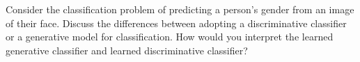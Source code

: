 Consider the classification problem of predicting a person's gender from an image of their face. Discuss the differences between adopting a discriminative classifier or a generative model for classification. How would you interpret the learned generative classifier and learned discriminative classifier?
